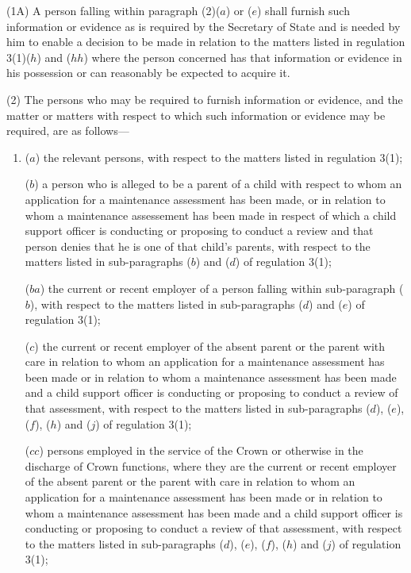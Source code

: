 \documentclass[a4paper]{article}
\begin{document}
(1A) A person falling within paragraph (2)($a$) or ($e$) shall furnish such information or evidence as is required by the Secretary of State and is needed by him to enable a decision to be made in relation to the matters listed in regulation 3(1)($h$) and ($hh$) where the person concerned has that information or evidence in his possession or can reasonably be expected to acquire it.

(2) The persons who may be required to furnish information or evidence, and the matter or matters with respect to which such information or evidence may be required, are as follows—
\begin{enumerate}\item[]
($a$) the relevant persons, with respect to the matters listed in regulation 3(1);

($b$) a person who is alleged to be a parent of a child with respect to whom an application for a maintenance 
assessment has been made, or in relation to whom a maintenance assessement has been made in respect of which a child support officer is conducting or proposing to conduct a review and that person  %
denies that he is one of that child’s parents, with respect to the matters listed in sub-paragraphs ($b$) and ($d$) of regulation 3(1);

($ba$) the current or recent employer of a person falling within sub-\hspace{0pt}paragraph ($b$), with respect to the matters listed in sub-\hspace{0pt}paragraphs ($d$) and ($e$) of regulation 3(1);

($c$) the current or recent employer of the absent parent or the parent with care in relation to whom an application for a maintenance assessment has been made 
or in relation to whom a maintenance assessment has been made and a child support officer is conducting or proposing to conduct a review of that assessment,  %
with respect to the matters listed in sub-paragraphs ($d$), ($e$), ($f$), ($h$) and ($j$) of regulation 3(1);

($cc$) persons employed in the service of the Crown or otherwise in the discharge of Crown functions, where they are the current or recent employer of the absent parent or the parent with care in relation to whom an application for a maintenance assessment has been made 
or in relation to whom a maintenance assessment has been made and a child support officer is conducting or proposing to conduct a review of that assessment,  %
with respect to the matters listed in sub-paragraphs ($d$), ($e$), ($f$), ($h$) and ($j$) of regulation 3(1);


\end{enumerate}
\end{document}
